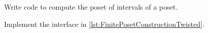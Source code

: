 
\begin{codeexercise}
    Write code to compute the poset of intervals of a poset.

    Implement the interface in \cref{lst:FinitePosetConstructionTwisted}.
\end{codeexercise}


